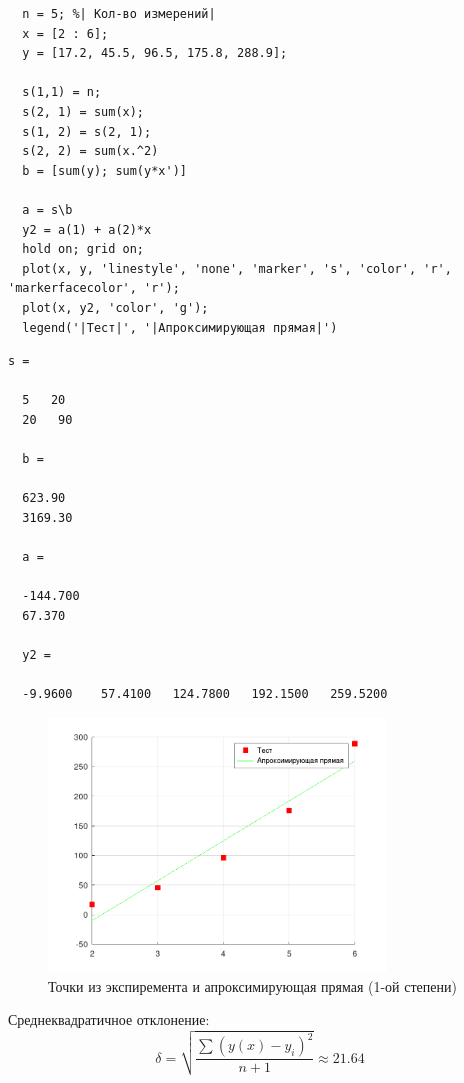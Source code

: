 \begin{lstlisting}
  n = 5; %| Кол-во измерений|
  x = [2 : 6];
  y = [17.2, 45.5, 96.5, 175.8, 288.9];

  s(1,1) = n;
  s(2, 1) = sum(x);
  s(1, 2) = s(2, 1);
  s(2, 2) = sum(x.^2)
  b = [sum(y); sum(y*x')]

  a = s\b
  y2 = a(1) + a(2)*x
  hold on; grid on;
  plot(x, y, 'linestyle', 'none', 'marker', 's', 'color', 'r', 'markerfacecolor', 'r');
  plot(x, y2, 'color', 'g');
  legend('|Тест|', '|Апроксимирующая прямая|')
\end{lstlisting}
\begin{lstlisting}[backgroundcolor=\color{cyan}]
  s =

  5   20
  20   90

  b =

  623.90
  3169.30

  a =

  -144.700
  67.370

  y2 =

  -9.9600    57.4100   124.7800   192.1500   259.5200

\end{lstlisting}
\begin{figure}[H]
  \caption{Точки из экспиремента и апроксимирующая прямая (1-ой степени)}
  \label{fig:plot_7_1}
  \centering
  \includegraphics[width=0.8\textwidth]{images/task_7_1.png}
\end{figure}
Среднеквадратичное отклонение:
\[
  \delta = \sqrt{\frac{\sum(y(x)-y_{i})^{2}}{n+1}} \approx 21.64
\]

